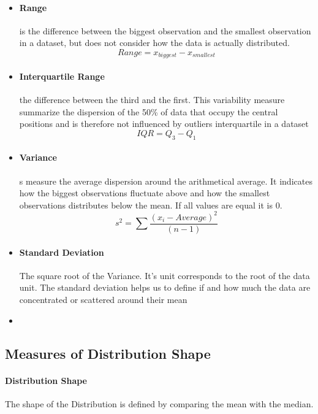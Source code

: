 \documentclass[11pt]{article}
\begin{document}
    \begin{itemize}
        \item \paragraph{Range} is the difference between the biggest observation and the smallest observation in a dataset, 
        but does not consider how the data is actually distributed. 
         $$Range = x_{biggest} - x_{smallest}$$
        \item \paragraph{Interquartile Range} the difference between the third and the first. 
        This variability measure summarize the dispersion of the 50\% of data that
        occupy the central positions and is therefore not influenced by outliers
        interquartile in a dataset 
        $$IQR=Q_3-Q_1$$
        \item \paragraph{Variance} s measure the average dispersion
        around the arithmetical average. It indicates how the biggest observations
        fluctuate above and how the smallest observations distributes below the mean. If all values are equal it is 0.
        $$s^2=\sum \frac{(x_i-Average)^2}{(n-1)}$$
        \item \paragraph{Standard Deviation} The square root of the Variance. It's unit corresponds to the root of the data unit.
        The standard deviation helps us to define if and how much the data are
        concentrated or scattered around their mean
    \item \end{itemize}
    
    \subsection{Measures of Distribution Shape}
    
    \paragraph{Distribution Shape} The shape of the Distribution is defined by comparing the mean with the median. 
    
\end{document}
